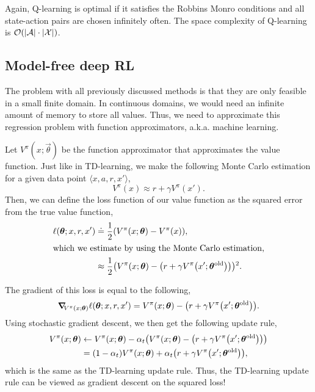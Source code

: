 Again, Q-learning is optimal if it satisfies the Robbins Monro conditions and
all state-action pairs are chosen infinitely often. The space complexity of
Q-learning is $\bigo{|\mathcal{A}| \cdot |\mathcal{X}|}$.

\subsection{Model-free deep RL}


The problem with all previously discussed methods is that they are only feasible
in a small finite domain. In continuous domains, we would need an infinite
amount of memory to store all values. Thus, we need to approximate this
regression problem with function approximators, a.k.a. machine learning.

Let $V^\pi(x;\vec{\theta})$ be the function approximator that approximates the
value function. Just like in TD-learning, we make the following Monte Carlo
estimation for a given data point $\langle x, a, r, x' \rangle$, \[
  V^\pi(x) \approx r + \gamma V^\pi(x')
.\]
Then, we can define the loss function of our value function as the squared error
from the true value function,
\begin{align*}
  \ell(\vec{\theta} ; x, r, x') &\doteq \frac{1}{2} \lft( V^\pi(x;\vec{\theta}) - V^\pi(x) \rgt), \\
  \intertext{which we estimate by using the Monte Carlo estimation,}
  &\approx \frac{1}{2} \lft( V^\pi(x;\vec{\theta}) - \lft( r + \gamma V^\pi\lft(x'; \vec{\theta}^{\mathrm{old}}\rgt)\rgt) \rgt)^2
.\end{align*}

The gradient of this loss is equal to the following, \[
  \grad{\ell(\vec{\theta} ; x,r,x')}{V^\pi(x;\vec{\theta})} = V^\pi(x;\vec{\theta}) - \lft( r + \gamma V^\pi\lft(x'; \vec{\theta}^{\mathrm{old}}\rgt)\rgt)
.\]
Using stochastic gradient descent, we then get the following update rule,
\begin{align*}
  V^\pi(x;\vec{\theta}) &\gets V^\pi(x;\vec{\theta}) - \alpha_t \lft(V^\pi(x;\vec{\theta}) - \lft( r + \gamma V^\pi\lft(x'; \vec{\theta}^{\mathrm{old}}\rgt)\rgt)\rgt) \\
  &= (1-\alpha_t) V^\pi(x;\vec{\theta}) + \alpha_t \lft( r + \gamma V^\pi\lft(x'; \vec{\theta}^{\mathrm{old}}\rgt)\rgt)
,\end{align*}
which is the same as the TD-learning update rule. Thus, the TD-learning update
rule can be viewed as gradient descent on the squared loss!

